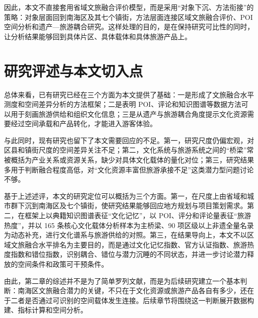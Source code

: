 因此，本文不直接套用省域文旅融合评价模型，而是采用``对象下沉、方法衔接''的策略：对象层面回到南海区及其七个镇街，方法层面连接区域文旅融合评价、POI 空间分析和遗产---旅游耦合研究。这样处理的目的，是在保持研究可比性的同时，让分析结果能够回到具体片区、具体载体和具体旅游产品上。

\section{研究评述与本文切入点}\label{ux7814ux7a76ux8bc4ux8ff0ux4e0eux672cux6587ux5207ux5165ux70b9}

总体来看，已有研究已经在三个方面为本文提供了基础：一是形成了文旅融合水平测度和空间差异分析的方法框架；二是表明 POI、评论和知识图谱等数据方法可以用于刻画旅游供给和组织文化信息；三是从遗产与旅游耦合角度提示文化资源需要经过空间承载和产品转化，才能进入游客体验。

与此同时，现有研究也留下了本文需要回应的不足。第一，研究尺度仍偏宏观，对区县和镇街尺度的空间差异关注不足；第二，文化系统与旅游系统之间的``桥梁''常被概括为产业关系或资源关系，缺少对具体文化载体的量化对位；第三，研究结果多用于判断融合程度高低，对``文化资源丰富但旅游承接不足''这类潜力型问题讨论不够。

基于上述述评，本文的研究定位可以概括为三个方面。第一，在尺度上由省域和城市群下沉到南海区及七个镇街，使研究结果能够回应地方规划与项目策划需求。第二，在框架上以典籍知识图谱表征``文化记忆''，以 POI、评分和评论量表征``旅游热度''，并以 165 条核心文化载体分析样本为主桥梁、90 项区级以上非遗全量名录为动态补充，进行文化谱系与旅游供给的对照。第三，在结果导向上，本文不以区域文旅融合水平排名为主要目的，而是通过文化记忆指数、官方认证指数、旅游热度指数和错位指数，识别耦合、错位与潜力沉睡的不同状态，并进一步讨论潜力释放的空间条件和政策可干预条件。

由此，第二章的综述并不是为了简单罗列文献，而是为后续研究建立一个基本判断：南海区文旅融合潜力的关键，不只在于文化资源或旅游产品各自有多少，还在于二者是否通过可识别的空间载体发生连接。后续章节将围绕这一判断展开数据构建、指标计算和空间分析。
